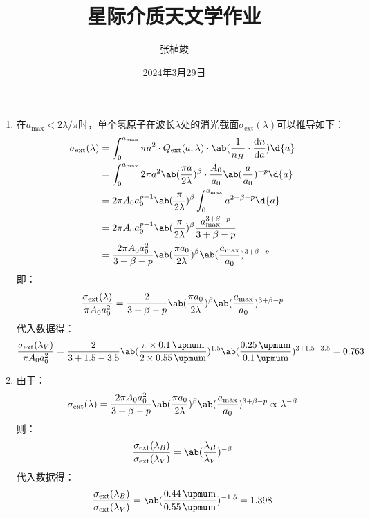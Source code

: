 \documentclass[a4paper,fontset=none]{ctexart}
\title{\textbf{星际介质天文学作业}}
\author{张植竣}
\date{2024年3月29日}
\newcommand{\um}{\upmu\mathrm{m}}
\begin{document}
\maketitle

\begin{enumerate}
    \item[23.1 (a)]
    在$a_{\mathrm{max}} < 2\lambda/\pi$时，单个氢原子在波长$\lambda$处的消光截面$\sigma_{\mathrm{ext}}(\lambda)$可以推导如下：
    \begin{align*}
        \sigma_{\mathrm{ext}}(\lambda)
        &= \int_0^{a_{\mathrm{max}}} \pi a^2 \cdot Q_{\mathrm{ext}}(a, \lambda) \cdot \ab(\frac{1}{n_H} \cdot \odv{n}{a}) \d{a} \\
        &= \int_0^{a_{\mathrm{max}}} 2\pi a^2 \ab(\frac{\pi a}{2 \lambda})^\beta \cdot \frac{A_0}{a_0} \ab(\frac{a}{a_0})^{-p} \d{a} \\
        &= 2\pi A_0 a_0^{p-1} \ab(\frac{\pi}{2\lambda})^\beta \int_0^{a_{\mathrm{max}}} a^{2 + \beta - p} \d{a} \\
        &= 2\pi A_0 a_0^{p-1} \ab(\frac{\pi}{2\lambda})^\beta \frac{a_{\mathrm{max}}^{3 + \beta - p}}{3 + \beta - p} \\
        &= \frac{2\pi A_0 a_0^2}{3 + \beta - p} \ab(\frac{\pi a_0}{2\lambda})^\beta \ab(\frac{a_{\mathrm{max}}}{a_0})^{3 + \beta - p}
    \end{align*}
    即：
    \[
        \frac{\sigma_{\mathrm{ext}}(\lambda)}{\pi A_0 a_0^2} = \frac{2}{3 + \beta - p} \ab(\frac{\pi a_0}{2\lambda})^\beta \ab(\frac{a_{\mathrm{max}}}{a_0})^{3 + \beta - p}
    \]
    代入数据得：
    \[
        \frac{\sigma_{\mathrm{ext}}(\lambda_V)}{\pi A_0 a_0^2} = \frac{2}{3 + 1.5 - 3.5} \ab(\frac{\pi \times 0.1\,\um}{2 \times 0.55\,\um})^{1.5} \ab(\frac{0.25\,\um}{0.1\,\um})^{3 + 1.5 - 3.5} = 0.763
    \]

    \medskip
    \item[23.1 (b)]
    由于：
    \[
        \sigma_{\mathrm{ext}}(\lambda) = \frac{2\pi A_0 a_0^2}{3 + \beta - p} \ab(\frac{\pi a_0}{2\lambda})^\beta \ab(\frac{a_{\mathrm{max}}}{a_0})^{3 + \beta - p} \propto \lambda^{-\beta}
    \]
    则：
    \[
        \frac{\sigma_{\mathrm{ext}}(\lambda_B)}{\sigma_{\mathrm{ext}}(\lambda_V)} = \ab(\frac{\lambda_B}{\lambda_V})^{-\beta}
    \]
    代入数据得：
    \[
        \frac{\sigma_{\mathrm{ext}}(\lambda_B)}{\sigma_{\mathrm{ext}}(\lambda_V)} = \ab(\frac{0.44\,\um}{0.55\,\um})^{-1.5} = 1.398
    \]


\end{enumerate}
\end{document}
